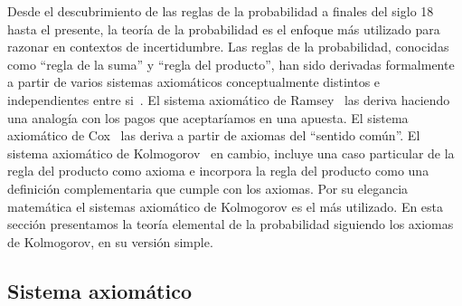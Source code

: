 \documentclass[a4paper,11pt]{book}
\theoremstyle{definition}
\begin{document}
Desde el descubrimiento de las reglas de la probabilidad a finales del siglo 18 hasta el presente, la teor\'ia de la probabilidad es el enfoque m\'as utilizado para razonar en contextos de incertidumbre.
%
Las reglas de la probabilidad, conocidas como ``regla de la suma'' y ``regla del producto'', han sido derivadas formalmente a partir de varios sistemas axiom\'aticos conceptualmente distintos e independientes entre si~\cite{halpern2017}.
%
El sistema axiom\'atico de Ramsey~\cite{Ramsey1926} las deriva haciendo una analog\'ia con los pagos que aceptar\'iamos en una apuesta.
%
El sistema axiom\'atico de Cox~\cite{Cox1946} las deriva a partir de axiomas del ``sentido com\'un''.
%
El sistema axiom\'atico de Kolmogorov~\cite{Kolmogorov1950} en cambio, incluye una caso particular de la regla del producto como axioma e incorpora la regla del producto como una definici\'on complementaria que cumple con los axiomas.
%
Por su elegancia matem\'atica el sistemas axiom\'atico de Kolmogorov es el m\'as utilizado.
%
En esta secci\'on presentamos la teor\'ia elemental de la probabilidad siguiendo los axiomas de Kolmogorov, en su versi\'on simple.

\subsection{Sistema axiom\'atico} \label{subsec_sistema_axiomatico}
\end{document}
